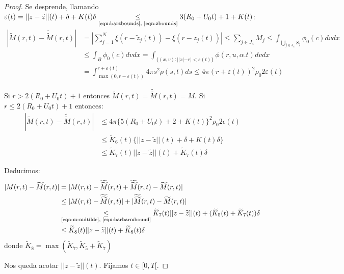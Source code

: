 \documentclass[a4paper,10pt]{scrartcl}
\theoremstyle{definition}
\newcommand{\ktilde}{\widetilde{K}}
\newcommand{\dtilde}[1]{\widetilde{\widetilde{#1}}}
\numberwithin{equation}{section}
\begin{document}
\begin{proof}
 Se desprende, llamando $\varepsilon(t) = ||z-\widetilde{z}||(t) + \delta + K(t)\delta \underset{\textrm{\eqref{eqn:barzbounds}, \eqref{eqn:zbounds}}}{\le} 3(R_0 + U_0 t) + 1 + K(t)$:
 \begin{align*}
 |\widetilde{M}(r,t) - \dtilde{M}(r,t)| &= \left|\sum_{j=1}^N \xi(r - \widetilde{z}_j(t)) - \xi(r - z_j(t)) \right| \le \sum_{j\in J_4} M_j
 \le \int_{\bigcup_{j\in J_4} S_j} \phi_0(c) dv dx\\
 &\le \int_{\underline{B}} \phi_0(c) dv dx
 = \int_{\{(x,v):||x| - r| < \varepsilon(t)\}} \phi(r,u,\alpha.t) dv dx \\
 &= \int_{\max(0,r-\varepsilon(t))}^{r+\varepsilon(t)} 4\pi s^2 \rho(s,t) ds \le 4\pi(r + \varepsilon(t))^2 \rho_0 2\varepsilon(t)
 \end{align*}
 
 Si $r > 2(R_0 + U_0t) + 1$ entonces $\widetilde{M}(r,t) = \dtilde{M}(r,t) = M$. Si $r \le 2(R_0 + U_0t) + 1$ entonces:
 \begin{align}
  |\widetilde{M}(r,t) - \dtilde{M}(r,t)| &\le 4\pi\bigg\{5(R_0 + U_0t) + 2 + K(t)\bigg\}^2 \rho_0 2\epsilon(t) \nonumber\\
  &\le \ktilde_6(t)\bigg\{||z-\widetilde{z}||(t) + \delta + K(t)\delta\bigg\} 
  \nonumber \\
  &\le \ktilde_7(t)||z - \widetilde{z}||(t) + \ktilde_7(t)\delta \label{eqn:barbarmbound}
 \end{align}
 
 Deducimos:
 \begin{align}
  |M(r,t) - \widetilde{M}(r,t)| &= |M(r,t) - \dtilde{M}(r,t) + \dtilde{M}(r,t) - \widetilde{M}(r,t)| \nonumber\\
  &\le |M(r,t) - \dtilde{M}(r,t)| + |\dtilde{M}(r,t) - \widetilde{M}(r,t)| \nonumber\\
  &\underset{\textrm{\eqref{eqn:m-mdtilde}, \eqref{eqn:barbarmbound}}}{\le} \ktilde_7(t)||z - \widetilde{z}||(t) + (\ktilde_5(t)+\ktilde_7(t))\delta \nonumber\\
  &\le \ktilde_8(t)||z - \widetilde{z}||(t) + \ktilde_8(t)\delta
  \label{ineq:diffm}
 \end{align}
donde $\ktilde_8 = \max(\ktilde_7, \ktilde_5 + \ktilde_7)$

Nos queda acotar $||z - \widetilde{z}||(t)$. Fijamos $t \in [0,T[$.


\end{proof}
\end{document}
